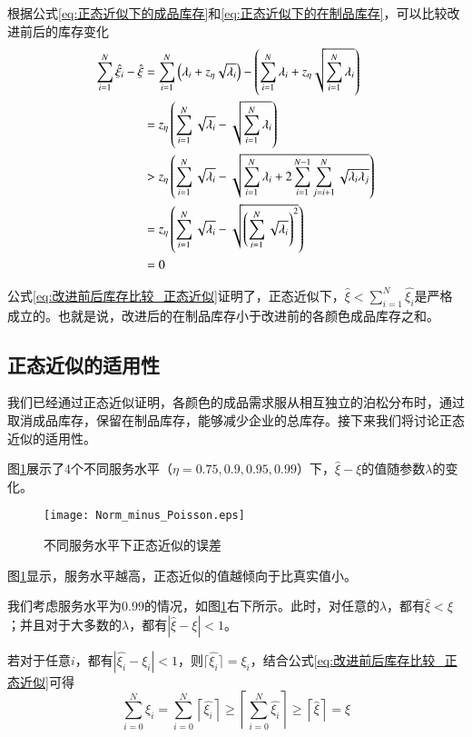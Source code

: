 根据公式\ref{eq:正态近似下的成品库存}和\ref{eq:正态近似下的在制品库存}，可以比较改进前后的库存变化
\begin{align}
\sum_{i=1}^N\hat{\xi_i} - \hat{\xi} &= \sum_{i=1}^N\left(\lambda_i + z_\eta\sqrt{\lambda_i}\right) - \left(\sum_{i=1}^N\lambda_i + z_\eta\sqrt{\sum_{i=1}^N\lambda_i}\right) \notag\\
&= z_\eta\left(\sum_{i=1}^N\sqrt{\lambda_i}-\sqrt{\sum_{i=1}^N\lambda_i}\right) \notag\\
&> z_\eta\left(\sum_{i=1}^N\sqrt{\lambda_i}-\sqrt{\sum_{i=1}^N\lambda_i+2\sum_{i=1}^{N-1}\sum_{j=i+1}^N\sqrt{\lambda_i\lambda_j}}\right) \notag\\
&= z_\eta\left(\sum_{i=1}^N\sqrt{\lambda_i}-\sqrt{\left(\sum_{i=1}^N\sqrt{\lambda_i}\right)^2}\right) \notag\\
&=0
\label{eq:改进前后库存比较_正态近似}
\end{align}

公式\ref{eq:改进前后库存比较_正态近似}证明了，正态近似下，$\hat{\xi} < \sum_{i=1}^N\hat{\xi_i}$是严格成立的。也就是说，改进后的在制品库存小于改进前的各颜色成品库存之和。




\subsection{正态近似的适用性}

我们已经通过正态近似证明，各颜色的成品需求服从相互独立的泊松分布时，通过取消成品库存，保留在制品库存，能够减少企业的总库存。接下来我们将讨论正态近似的适用性。

图\ref{fig:正态近似的误差}展示了4个不同服务水平（$\eta=0.75,0.9,0.95,0.99$）下，$\hat{\xi}-\xi$的值随参数$\lambda$的变化。

\begin{figure}[htb]
\centering
\texttt{[image: Norm\_minus\_Poisson.eps]}
\caption{不同服务水平下正态近似的误差}
\label{fig:正态近似的误差}
\end{figure}

图\ref{fig:正态近似的误差}显示，服务水平越高，正态近似的值越倾向于比真实值小。

我们考虑服务水平为0.99的情况，如图\ref{fig:正态近似的误差}右下所示。此时，对任意的$\lambda$，都有$\hat{\xi} < \xi$；并且对于大多数的$\lambda$，都有$|\hat{\xi} - \xi| < 1$。

若对于任意$i$，都有$|\hat{\xi_i}-\xi_i| < 1$，则$\lceil\hat{\xi_i}\rceil=\xi_i$，结合公式\ref{eq:改进前后库存比较_正态近似}可得
\begin{equation}
\sum_{i=0}^N \xi_i = \sum_{i=0}^N \left\lceil\hat{\xi_i}\right\rceil \geq \left\lceil\sum_{i=0}^N\hat{\xi_i}\right\rceil \geq \left\lceil\hat{\xi}\right\rceil = \xi
\end{equation}

